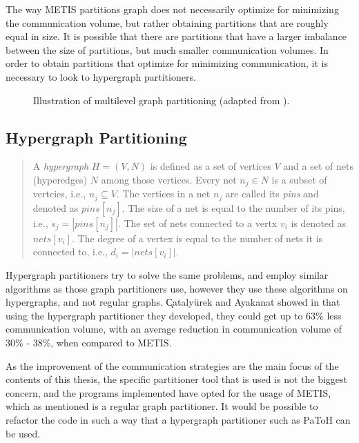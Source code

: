 The way METIS partitions graph does not necessarily optimize for minimizing the communication volume, but rather obtaining partitions that are roughly equal in size. It is possible that there are partitions that have a larger imbalance between the size of partitions, but much smaller communication volumes. In order to obtain partitions that optimize for minimizing communication, it is necessary to look to hypergraph partitioners.

\begin{figure}[H]
    \centering
    \caption{Illustration of multilevel graph partitioning (adapted from \cite{karypis1997metis}).}
    \label{fig:coarseninggraph}
\end{figure}

\subsection{Hypergraph Partitioning}
\begin{quote}
    A \emph{hypergraph} \(H = (V,N)\) is defined as a set of vertices \(V\) and a set of nets (hyperedges) \(N\) among those vertices. Every net \(n_{j} \in N\) is a subset of vertcies, i.e., \(n_{j} \subseteq V\). The vertices in a net \(n_{j}\) are called its \textit{pins} and denoted as \(pins[n_{j}]\). The size of a net is equal to the number of its pins, i.e., \(s_{j} = \left|  pins[n_{j}] \right|\). The set of nets connected to a vertx \(v_{i}\) is denoted as \(nets[v_{i}]\). The degree of a vertex is equal to the number of nets it is connected to, i.e., \(d_{i} = \left| nets[v_{i}] \right|\).
\end{quote}

\begin{flushright}
    \cite{hypergraphpartitioning}
\end{flushright}
\medskip
Hypergraph partitioners try to solve the same problems, and employ similar algorithms as those graph partitioners use, however they use these algorithms on hypergraphs, and not regular graphs. \k Cataly\" urek and Ayakanat showed in \cite{hypergraphpartitioning} that using the hypergraph partitioner they developed, they could get up to 63\% less communication volume, with an average reduction in communication volume of 30\% - 38\%, when compared to METIS.
\medskip

As the improvement of the communication strategies are the main focus of the contents of this thesis, the specific partitioner tool that is used is not the biggest concern, and the programs implemented have opted for the usage of METIS, which as mentioned is a regular graph partitioner. It would be possible to refactor the code in such a way that a hypergraph partitioner such as PaToH can be used.



